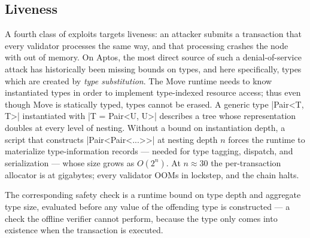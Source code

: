 \subsection{Liveness}
\label{sec:bugs:oom}

A fourth class of exploits targets liveness: an attacker submits a transaction that every validator processes the same way, and that processing crashes the node with out of memory.
On Aptos, the most direct source of such a denial-of-service attack has historically been missing bounds on types, and here specifically, types which are created by \emph{type substitution}.
The Move runtime needs to know instantiated types in order to implement type-indexed resource access; thus even though Move is statically typed, types cannot be erased.
A generic type |Pair<T, T>| instantiated with |T = Pair<U, U>| describes a tree whose representation doubles at every level of nesting.
Without a bound on instantiation depth, a script that constructs |Pair<Pair<...>>| at nesting depth $n$ forces the runtime to materialize type-information records --- needed for type tagging, dispatch, and serialization --- whose size grows as $O(2^n)$.
At $n \approx 30$ the per-transaction allocator is at gigabytes; every validator OOMs in lockstep, and the chain halts.

The corresponding safety check is a runtime bound on type depth and aggregate type size, evaluated before any value of the offending type is constructed --- a check the offline verifier cannot perform, because the type only comes into existence when the transaction is executed.

